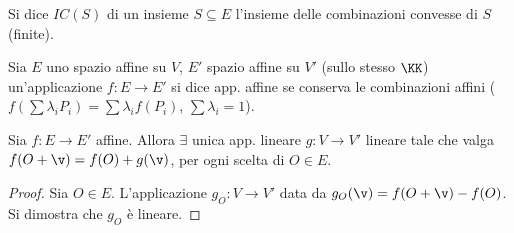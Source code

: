 \documentclass[11pt]{article}
\begin{document}
	\begin{definition}  Si dice $IC(S)$ di un insieme
		$S \subseteq E$ l'insieme delle combinazioni convesse di $S$ (finite).
	\end{definition}

	
	\begin{definition} Sia $E$ uno spazio affine su $V$, $E'$ spazio
		affine su $V'$ (sullo stesso $\KK$) un'applicazione $f : E \to E'$
		si dice app. affine se conserva le combinazioni affini
		($f(\sum \lambda_i P_i) = \sum \lambda_i f(P_i)$, $\sum \lambda_i = 1$).
	\end{definition}

	\begin{theorem} Sia $f : E \to E'$ affine. Allora $\exists$ unica
		app. lineare $g : V \to V'$ lineare tale che valga
		$f(O + \v) = f(O) + g(\v)$, per ogni scelta di $O \in E$.
	\end{theorem}

	\begin{proof}
		Sia $O \in E$. L'applicazione $g_O : V \to V'$ data da
		$g_O(\v) = f(O + \v) - f(O)$. Si dimostra che $g_O$ è
		lineare.
	\end{proof}
\end{document}
